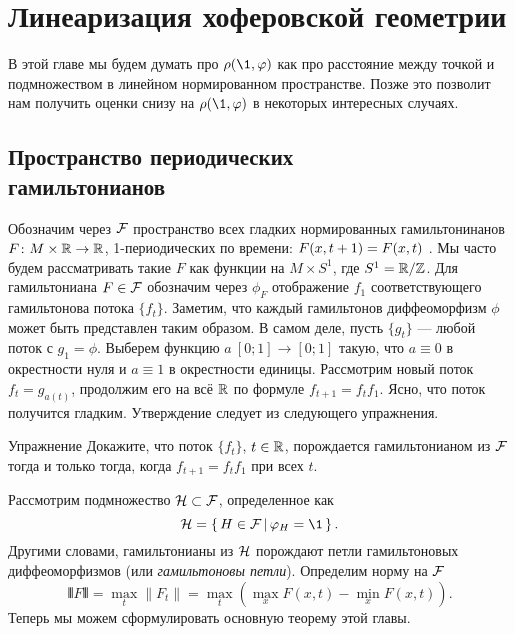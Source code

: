 \chapter{Линеаризация хоферовской геометрии}

В этой главе мы будем думать про $\rho (\1, \phi)$ как про расстояние между точкой и подмножеством в линейном нормированном пространстве.
Позже это позволит нам получить оценки снизу на $\rho (\1, \phi)$ в некоторых интересных случаях.

\section[Периодические гамильтонианы]{Пространство периодических\\гамильтонианов}

Обозначим через \index[symb]{$\F$}$\F$ пространство всех гладких нормированных
гамильтонинанов $F\colon M \times \mathbb{R} \to \mathbb{R}$, 1-периодических по
времени: $F (x, t \z+ 1) = F (x, t)$ .
Мы часто будем рассматривать такие $F$ как функции на $M \times S^1$,
где $S^1 = \mathbb{R} / \mathbb{Z}$. 
Для гамильтониана $F \in \mathcal{F}$ обозначим через $\phi_F$ отображение
$f_1$ соответствующего гамильтонова потока $\{f_t\}$. 
Заметим, что каждый гамильтонов диффеоморфизм $\phi$ может быть
представлен таким образом. 
В самом деле, пусть $\{g_t\}$ — любой поток с $g_1 = \phi$.
Выберем функцию $a\: [0; 1] \to [0; 1]$ такую, что $a \equiv 0$ в окрестности нуля и $a \equiv 1$ в окрестности единицы.
Рассмотрим новый поток $f_t = g_{a(t)}$, 
продолжим его на всё $\mathbb{R}$ по формуле $f_{t+1} = f_t f_1$.
Ясно, что поток получится гладким.
Утверждение следует из следующего упражнения.

\begin{ex}{Упражнение}\label{5.1.A}
Докажите, что  поток $\{f_t\}$, $t \z\in \RR$,
порождается гамильтонианом из $\F$ тогда и только тогда, когда
$f_{t+1} = f_t f_1$ при всех $t$. 
\end{ex}

Рассмотрим подмножество \index[symb]{$\H$}$\mathcal{H} \subset \mathcal{F}$, определенное как 
\[\H = \set{H \in \F}{\phi_H = \1}.\]
Другими словами, гамильтонианы из $\H$ порождают петли гамильтоновых диффеоморфизмов (или \emph{гамильтоновы петли}).
Определим норму на $\F$ 
\[\VERT F \VERT = \max_{t} \| F_t \| = \max_{t} (\max_{x} F (x, t) -
\min_{x} F (x, t)).\]
Теперь мы можем сформулировать основную теорему этой главы.

